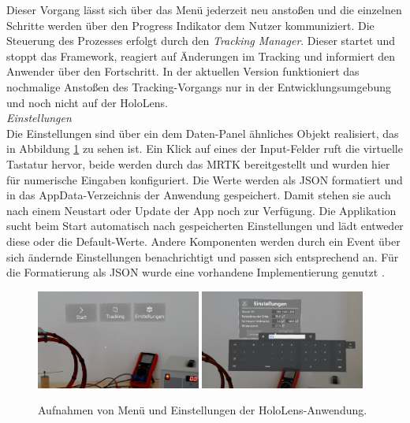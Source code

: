 Dieser Vorgang lässt sich über das Menü jederzeit neu anstoßen und die einzelnen Schritte werden über den Progress Indikator dem Nutzer kommuniziert. Die Steuerung des Prozesses erfolgt durch den \textit{Tracking Manager}. Dieser startet und stoppt das Framework, reagiert auf Änderungen im Tracking und informiert den Anwender über den Fortschritt. In der aktuellen Version funktioniert das nochmalige Anstoßen des Tracking-Vorgangs nur in der Entwicklungsumgebung und noch nicht auf der HoloLens.\\

\textit{Einstellungen}\\
Die Einstellungen sind über ein dem Daten-Panel ähnliches Objekt realisiert, das in Abbildung \ref{img:menu-and-settings} zu sehen ist. Ein Klick auf eines der Input-Felder ruft die virtuelle Tastatur hervor, beide werden durch das MRTK bereitgestellt und wurden hier für numerische Eingaben konfiguriert. Die Werte werden als JSON formatiert und in das AppData-Verzeichnis der Anwendung gespeichert. Damit stehen sie auch nach einem Neustart oder Update der App noch zur Verfügung. Die Applikation sucht beim Start automatisch nach gespeicherten Einstellungen und lädt entweder diese oder die Default-Werte. Andere Komponenten werden durch ein Event über sich ändernde Einstellungen benachrichtigt und passen sich entsprechend an. Für die Formatierung als JSON wurde eine vorhandene Implementierung genutzt \cite{Goebel17}.\\

\begin{figure}[H]
	\centering
	\includegraphics[width=0.48\textwidth]{images/HL/menu_c.jpg}
	\hspace{0.02\textwidth}	
	\includegraphics[width=0.48\textwidth]{images/HL/settings_c.jpg}
	\caption{Aufnahmen von Menü und Einstellungen der HoloLens-Anwendung.}
	\label{img:menu-and-settings}
\end{figure}

